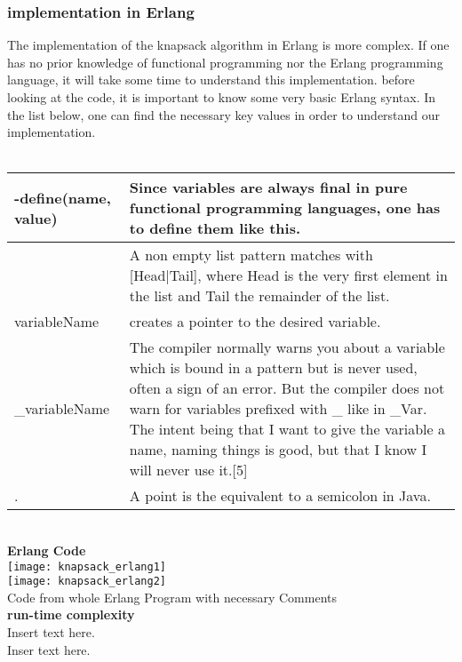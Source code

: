 \subsubsection{implementation in Erlang}
The implementation of the knapsack algorithm in Erlang is more complex. If one has no prior knowledge of functional programming nor the Erlang programming language, it will take some time to understand this implementation. before looking at the code, it is important to know some very basic Erlang syntax. In the list below, one can find the necessary key values in order to understand our implementation.\\\\
\begin{tabular}{|lp{5cm}|}
\hline
-define(name, value)  & Since variables are always final in pure functional programming languages, one has to define them like this.\\ \hline
[H|T] & A non empty list pattern matches with [Head|Tail], where Head is the very first element in the list and Tail the remainder of the list. \\  \hline
\?variableName & creates a pointer to the desired variable. \\ \hline
\_variableName & The compiler normally warns you about a variable which is bound in a pattern but is never used, often a sign of an error. But the compiler does not warn for variables prefixed with \_ like in \_Var. The intent being that I want to give the variable a name, naming things is good, but that I know I will never use it.[5] \\ \hline 
. & A point is the equivalent to a semicolon in Java.\\ \hline
\end{tabular}\\
\pagebreak
\textbf{Erlang Code}\\
\texttt{[image: knapsack\_erlang1]}\\
\texttt{[image: knapsack\_erlang2]}\\
Code from whole Erlang Program with necessary Comments\\
\textbf{run-time complexity}\\
Insert text here.\\
Inser text here.\\

